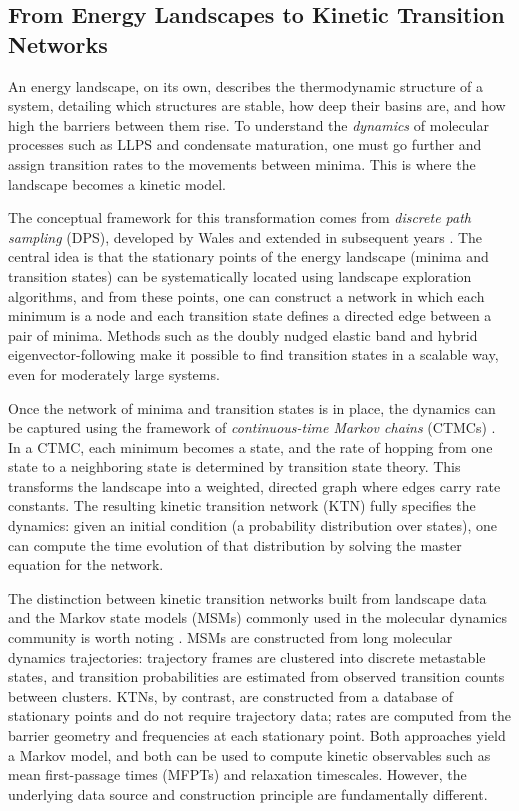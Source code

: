 \subsection{From Energy Landscapes to Kinetic Transition Networks}

An energy landscape, on its own, describes the thermodynamic structure of a system, detailing which
structures are stable, how deep their basins are, and how high the barriers
between them rise. To understand the \emph{dynamics} of molecular processes such as LLPS and condensate maturation, one must go further and assign transition rates to the movements between minima. This is where the landscape becomes a kinetic model.

The conceptual framework for this transformation comes from \emph{discrete path sampling} (DPS), developed by Wales and extended in subsequent years \cite{Wales2002DPS}. The central idea is that the stationary points of the energy landscape (minima and transition states) can be systematically located using landscape exploration algorithms, and from these points, one can construct a network in which each minimum is a node and each transition state defines a directed edge between a pair of minima. Methods such as the doubly nudged elastic band \cite{Trygubenko2004DNEB} and hybrid eigenvector-following \cite{Munro1999HEF} make it possible to find transition states in a scalable way, even for moderately large systems.

Once the network of minima and transition states is in place, the dynamics can be captured using the framework of \emph{continuous-time Markov chains} (CTMCs) \cite{Wales2002DPS}. In a CTMC, each minimum becomes a state, and the rate of hopping from one state to a neighboring state is determined by transition state theory. This transforms the landscape into a weighted, directed graph where edges carry rate constants. The resulting kinetic transition network (KTN) fully specifies the dynamics: given an initial condition (a probability distribution over states), one can compute the time evolution of that distribution by solving the master equation for the network.

The distinction between kinetic transition networks built from landscape data and the Markov state models (MSMs) commonly used in the molecular dynamics community is worth noting \cite{Noe2013MSMReview,Pande2010MSMReview}. MSMs are constructed from long molecular dynamics trajectories: trajectory frames are clustered into discrete metastable states, and transition probabilities are estimated from observed transition counts between clusters. KTNs, by contrast, are constructed from a database of stationary points and do not require trajectory data; rates are computed from the barrier geometry and frequencies at each stationary point. Both approaches yield a Markov model, and both can be used to compute kinetic observables such as mean first-passage times (MFPTs) and relaxation timescales. However, the underlying data source and construction principle are fundamentally different.

